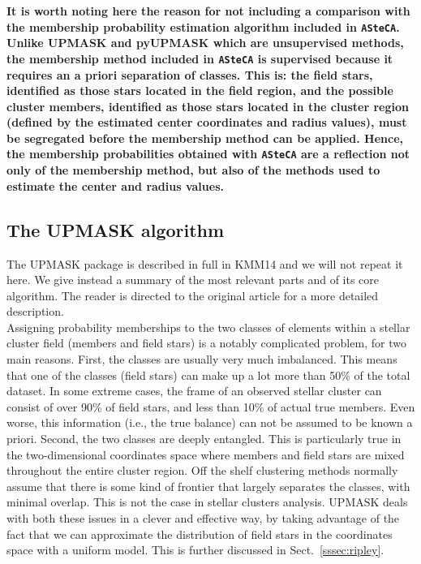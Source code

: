 \documentclass{aa}
\begin{document}
 \textbf{It is worth noting here the reason for not including a comparison with
 the membership probability estimation algorithm included in \texttt{ASteCA}.
 Unlike UPMASK and pyUPMASK which are unsupervised methods, the membership
 method included in \texttt{ASteCA} is supervised because it requires
 an a priori separation of classes. This is: the field stars, identified as
 those stars located in the field region, and the possible cluster members,
 identified as those stars located in the cluster region (defined by the
 estimated center coordinates and radius values), must be segregated before
 the membership method can be applied. Hence, the membership probabilities
 obtained with \texttt{ASteCA} are a reflection not only of the membership
 method, but also of the methods used to estimate the center and radius
 values.
 }



\subsection{The UPMASK algorithm}
 \label{ssec:upmask}

 The UPMASK package is described in full in KMM14 and we will not repeat it
 here. We give instead a summary of the most relevant parts and of its core
 algorithm. The reader is directed to the original article for a more detailed
 description.\\
 
 Assigning probability memberships to the two classes of elements within a 
 stellar cluster field (members and field stars) is a notably complicated
 problem, for two main reasons. First, the classes are usually very much
 imbalanced. This means that one of the classes (field stars) can make up a
 lot more than 50\% of the total dataset. In some extreme cases, the frame of
 an observed stellar cluster can consist of over 90\% of field stars, and less
 than 10\% of actual true members. Even worse, this information (i.e., the
 true balance) can not be assumed to be known a priori.
 Second, the two classes are deeply entangled. This is particularly true in the
 two-dimensional coordinates space where members and field stars are mixed
 throughout the entire cluster region. Off the shelf clustering methods
 normally assume that there is some kind of frontier that largely separates
 the classes, with minimal overlap. This is not the case in stellar clusters
 analysis.
 UPMASK deals with both these issues in a clever and effective way, by taking
 advantage of the fact that we can approximate the distribution of field stars
 in the coordinates space with a uniform model. This is further discussed
 in Sect.~\ref{sssec:ripley}.\\
\end{document}
